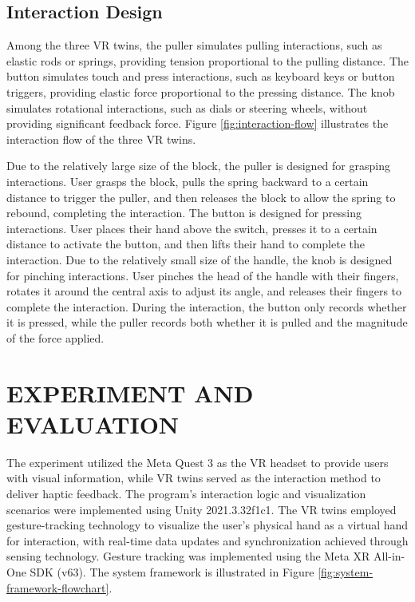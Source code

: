 \documentclass[runningheads]{llncs}
\begin{document}
\subsection{Interaction Design}
Among the three VR twins, the puller simulates pulling interactions, such as elastic rods or springs, providing tension proportional to the pulling distance. The button simulates touch and press interactions, such as keyboard keys or button triggers, providing elastic force proportional to the pressing distance. The knob simulates rotational interactions, such as dials or steering wheels, without providing significant feedback force. Figure \ref{fig:interaction-flow} illustrates the interaction flow of the three VR twins.

Due to the relatively large size of the block, the puller is designed for grasping interactions. User grasps the block, pulls the spring backward to a certain distance to trigger the puller, and then releases the block to allow the spring to rebound, completing the interaction. The button is designed for pressing interactions. User places their hand above the switch, presses it to a certain distance to activate the button, and then lifts their hand to complete the interaction. Due to the relatively small size of the handle, the knob is designed for pinching interactions. User pinches the head of the handle with their fingers, rotates it around the central axis to adjust its angle, and releases their fingers to complete the interaction. During the interaction, the button only records whether it is pressed, while the puller records both whether it is pulled and the magnitude of the force applied.


\section{EXPERIMENT AND EVALUATION}
The experiment utilized the Meta Quest 3 as the VR headset to provide users with visual information, while VR twins served as the interaction method to deliver haptic feedback. The program's interaction logic and visualization scenarios were implemented using Unity 2021.3.32f1c1. The VR twins employed gesture-tracking technology to visualize the user's physical hand as a virtual hand for interaction, with real-time data updates and synchronization achieved through sensing technology. Gesture tracking was implemented using the Meta XR All-in-One SDK (v63). The system framework is illustrated in Figure \ref{fig:system-framework-flowchart}.
\end{document}
